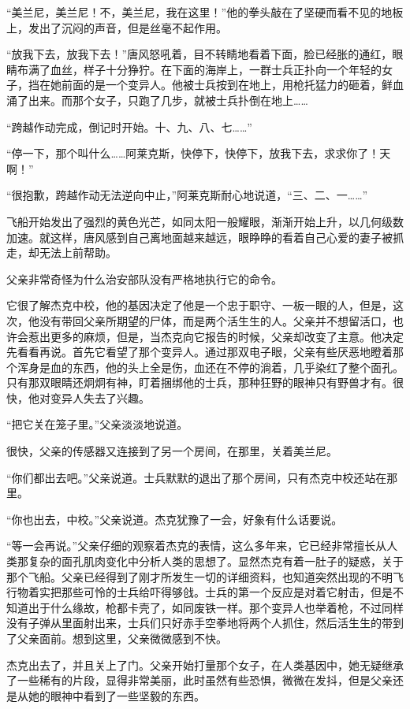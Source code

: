“美兰尼，美兰尼！不，美兰尼，我在这里！”他的拳头敲在了坚硬而看不见的地板上，发出了沉闷的声音，但是丝毫不起作用。

“放我下去，放我下去！”唐风怒吼着，目不转睛地看着下面，脸已经胀的通红，眼睛布满了血丝，样子十分狰狞。在下面的海岸上，一群士兵正扑向一个年轻的女子，挡在她前面的是一个变异人。他被士兵按到在地上，用枪托猛力的砸着，鲜血涌了出来。而那个女子，只跑了几步，就被士兵扑倒在地上……

“跨越作动完成，倒记时开始。十、九、八、七……”

“停一下，那个叫什么……阿莱克斯，快停下，快停下，放我下去，求求你了！天啊！”

“很抱歉，跨越作动无法逆向中止，”阿莱克斯耐心地说道，“三、二、一……”

飞船开始发出了强烈的黄色光芒，如同太阳一般耀眼，渐渐开始上升，以几何级数加速。就这样，唐风感到自己离地面越来越远，眼睁睁的看着自己心爱的妻子被抓走，却无法上前帮助。

父亲非常奇怪为什么治安部队没有严格地执行它的命令。

它很了解杰克中校，他的基因决定了他是一个忠于职守、一板一眼的人，但是，这次，他没有带回父亲所期望的尸体，而是两个活生生的人。父亲并不想留活口，也许会惹出更多的麻烦，但是，当杰克向它报告的时候，父亲却改变了主意。他决定先看看再说。首先它看望了那个变异人。通过那双电子眼，父亲有些厌恶地瞪着那个浑身是血的东西，他的头上全是伤，血还在不停的淌着，几乎染红了整个面孔。只有那双眼睛还炯炯有神，盯着捆绑他的士兵，那种狂野的眼神只有野兽才有。很快，他对变异人失去了兴趣。

“把它关在笼子里。”父亲淡淡地说道。

很快，父亲的传感器又连接到了另一个房间，在那里，关着美兰尼。

“你们都出去吧。”父亲说道。士兵默默的退出了那个房间，只有杰克中校还站在那里。

“你也出去，中校。”父亲说道。杰克犹豫了一会，好象有什么话要说。

“等一会再说。”父亲仔细的观察着杰克的表情，这么多年来，它已经非常擅长从人类那复杂的面孔肌肉变化中分析人类的思想了。显然杰克有着一肚子的疑惑，关于那个飞船。父亲已经得到了刚才所发生一切的详细资料，也知道突然出现的不明飞行物着实把那些可怜的士兵给吓得够戗。士兵的第一个反应是对着它射击，但是不知道出于什么缘故，枪都卡壳了，如同废铁一样。那个变异人也举着枪，不过同样没有子弹从里面射出来，士兵们只好赤手空拳地将两个人抓住，然后活生生的带到了父亲面前。想到这里，父亲微微感到不快。

杰克出去了，并且关上了门。父亲开始打量那个女子，在人类基因中，她无疑继承了一些稀有的片段，显得非常美丽，此时虽然有些恐惧，微微在发抖，但是父亲还是从她的眼神中看到了一些坚毅的东西。

